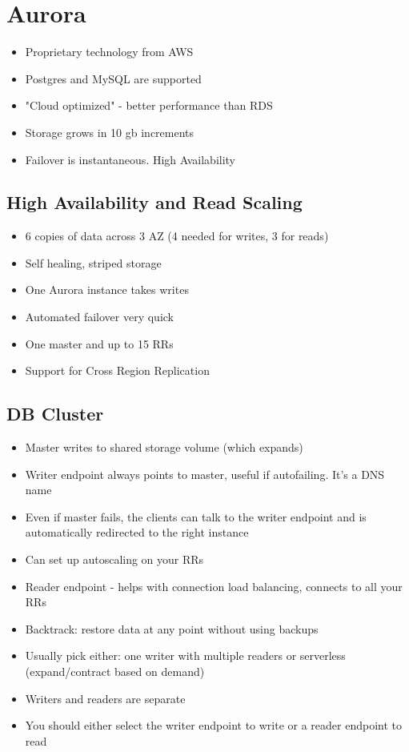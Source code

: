\documentclass[]{scrartcl}
\begin{document}
\section{Aurora}
\begin{itemize}
	\item Proprietary technology from AWS
	\item Postgres and MySQL are supported
	\item "Cloud optimized" - better performance than RDS
	\item Storage grows in 10 gb increments
	\item Failover is instantaneous. High Availability
\end{itemize}

\subsection{High Availability and Read Scaling}
\begin{itemize}
	\item 6 copies of data across 3 AZ (4 needed for writes, 3 for reads)
	\item Self healing, striped storage
	\item One Aurora instance takes writes
	\item Automated failover very quick
	\item One master and up to 15 RRs
	\item Support for Cross Region Replication
\end{itemize}

\subsection{DB Cluster}
\begin{itemize}
	\item Master writes to shared storage volume (which expands)
	\item Writer endpoint always points to master, useful if autofailing. It's a DNS name
	\item Even if master fails, the clients can talk to the writer endpoint and is automatically redirected to the right instance
	\item Can set up autoscaling on your RRs
	\item Reader endpoint - helps with connection load balancing, connects to all your RRs
	\item Backtrack: restore data at any point without using backups
	\item Usually pick either: one writer with multiple readers or serverless (expand/contract based on demand)
	\item Writers and readers are separate
	\item You should either select the writer endpoint to write or a reader endpoint to read
\end{itemize}
\end{document}
